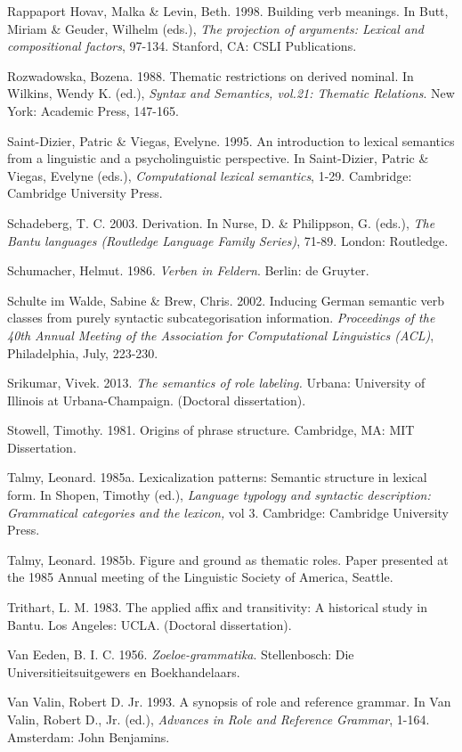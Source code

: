 \documentclass[output=paper]{langsci/langscibook}
\begin{document}
Rappaport Hovav, Malka \& Levin, Beth. 1998. Building verb meanings. In Butt, Miriam \& Geuder, Wilhelm (eds.), \textit{The projection of arguments: Lexical and compositional factors}, 97-134. Stanford, CA: CSLI Publications.

Rozwadowska, Bozena. 1988. Thematic restrictions on derived nominal. In Wilkins, Wendy K. (ed.), \textit{Syntax and Semantics, vol.21: Thematic Relations}. New York: Academic Press, 147-165.

Saint-Dizier, Patric \& Viegas, Evelyne. 1995. An introduction to lexical semantics from a linguistic and a psycholinguistic perspective. In Saint-Dizier, Patric \& Viegas, Evelyne (eds.), \textit{Computational lexical semantics}, 1-29. Cambridge: Cambridge   University Press.

Schadeberg, T. C. 2003. Derivation. In Nurse, D. \& Philippson, G. (eds.), \textit{The Bantu languages (Routledge Language Family Series)}, 71-89. London: Routledge.

Schumacher, Helmut. 1986. \textit{Verben in Feldern}. Berlin: de Gruyter.

Schulte im Walde, Sabine \& Brew, Chris. 2002. Inducing German semantic verb classes from purely syntactic subcategorisation information. \textit{Proceedings of the 40th Annual Meeting of the Association for Computational Linguistics (ACL)}, Philadelphia, July, 223-230.

Srikumar, Vivek. 2013. \textit{The semantics of role labeling.} Urbana: University of Illinois at Urbana-Champaign. (Doctoral dissertation).

Stowell, Timothy. 1981. Origins of phrase structure. Cambridge, MA: MIT Dissertation.

Talmy, Leonard. 1985a. Lexicalization patterns: Semantic structure in lexical form. In Shopen, Timothy (ed.), \textit{Language typology and syntactic description: Grammatical categories and the lexicon, }vol 3. Cambridge: Cambridge University Press.

Talmy, Leonard. 1985b. Figure and ground as thematic roles. Paper presented at the 1985 Annual meeting of the Linguistic Society of America, Seattle.

Trithart, L. M. 1983. The applied affix and transitivity: A historical study in Bantu. Los Angeles: UCLA. (Doctoral dissertation).

Van Eeden, B. I. C. 1956. \textit{Zoeloe-grammatika}. Stellenbosch: Die Universitieitsuitgewers en Boekhandelaars.

Van Valin, Robert D. Jr. 1993. A synopsis of role and reference grammar. In Van Valin, Robert D., Jr. (ed.), \textit{Advances in Role and Reference Grammar}, 1-164. Amsterdam: John Benjamins.
\end{document}
